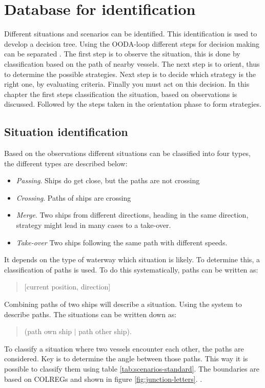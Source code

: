 \chapter{Database for identification}
Different situations and scenarios can be identified. This identification is used to develop a decision tree. Using the OODA-loop different steps for decision making can be separated . The first step is to observe the situation, this is done by classification based on the path of nearby vessels. The next step is to orient, thus to determine the possible strategies. Next step is to decide which strategy is the right one, by evaluating criteria. Finally you must act on this decision. In this chapter the first steps classification the situation, based on observations is discussed. Followed by the steps taken in the orientation phase to form strategies.

\section{Situation identification}
Based on the observations different situations can be classified into four types, the different types are described below: 
\begin{itemize}
	\item \emph{Passing}. Ships do get close, but the paths are not crossing
	\item \emph{Crossing}. Paths of ships are crossing
	\item \emph{Merge}. Two ships from different directions, heading in the same direction, strategy might lead in many cases to a take-over.
	\item \emph{Take-over} Two ships following the same path with different speeds.
\end{itemize}
It depends on the type of waterway which situation is likely. To determine this, a classification of paths is used. To do this systematically, paths can be written as: 
\begin{quote}
	[current position, direction]
\end{quote}
Combining paths of two ships will describe a situation. Using the system to describe paths. The situations can be written down as:
\begin{quote}
	(path own ship $|$ path other ship).
\end{quote}

To classify a situation where two vessels encounter each other, the paths are considered. Key is to determine the angle between those paths. This way it is possible to classify them using table \ref{tab:scenarios-standard}.
The boundaries are based on \ac{COLREGs} and shown in figure \ref{fig:junction-letters}. .

